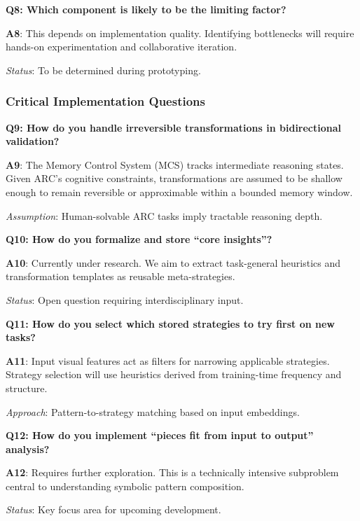 \documentclass[12pt]{article}
\begin{document}
\medskip

\textbf{Q8: Which component is likely to be the limiting factor?}

\textbf{A8}: This depends on implementation quality. Identifying bottlenecks will require hands-on experimentation and collaborative iteration.

\textit{Status}: To be determined during prototyping.

\subsubsection*{Critical Implementation Questions}

\textbf{Q9: How do you handle irreversible transformations in bidirectional validation?}

\textbf{A9}: The Memory Control System (MCS) tracks intermediate reasoning states. Given ARC’s cognitive constraints, transformations are assumed to be shallow enough to remain reversible or approximable within a bounded memory window.

\textit{Assumption}: Human-solvable ARC tasks imply tractable reasoning depth.

\medskip

\textbf{Q10: How do you formalize and store ``core insights''?}

\textbf{A10}: Currently under research. We aim to extract task-general heuristics and transformation templates as reusable meta-strategies.

\textit{Status}: Open question requiring interdisciplinary input.

\medskip

\textbf{Q11: How do you select which stored strategies to try first on new tasks?}

\textbf{A11}: Input visual features act as filters for narrowing applicable strategies. Strategy selection will use heuristics derived from training-time frequency and structure.

\textit{Approach}: Pattern-to-strategy matching based on input embeddings.

\medskip

\textbf{Q12: How do you implement ``pieces fit from input to output'' analysis?}

\textbf{A12}: Requires further exploration. This is a technically intensive subproblem central to understanding symbolic pattern composition.

\textit{Status}: Key focus area for upcoming development.
\end{document}
